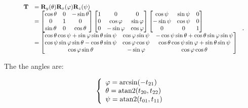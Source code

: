     \begin{equation}
        \scalebox{0.85}{
            $ \begin{array}{ll}
                \mathbf{T}
                &= \mathbf{R}_{y}(\theta)\mathbf{R}_{x}(\varphi)\mathbf{R}_{z}(\psi) \\
                &=
                \begin{bmatrix}
                    \cos \theta & 0 & -\sin \theta \\
                    0 & 1 & 0 \\
                    \sin \theta & 0 & \cos \theta
                \end{bmatrix}
                \begin{bmatrix}
                    1 & 0 & 0 \\
                    0 & \cos \varphi & \sin \varphi \\
                    0 & -\sin \varphi & \cos \varphi
                \end{bmatrix}
                \begin{bmatrix}
                    \cos \psi & \sin \psi & 0 \\
                    -\sin \psi & \cos \psi & 0 \\
                    0 & 0 & 1
                \end{bmatrix} \\
                &=
                \begin{bmatrix}
                    \cos \theta \cos \psi + \sin \varphi \sin \theta \sin \psi
                    &  \cos \varphi \sin \psi
                    & -\cos \psi \sin \theta + \cos \theta \sin \varphi \sin \psi \\
                    \cos \psi \sin \varphi \sin \theta - \cos \theta \sin \psi
                    & \cos \varphi \cos \psi
                    & \cos \theta \cos \psi \sin \varphi + \sin \theta \sin \psi \\
                    \cos \varphi \sin \theta
                    & -\sin \varphi
                    & \cos \varphi \cos \theta
                \end{bmatrix}
            \end{array} $
        }
    .\end{equation}

    The the angles are:

    \begin{equation}
        \left\{ \begin{array}{l}
            \varphi = \arcsin(-t_{21}) \\
            \theta = \operatorname{atan2}(t_{20}, t_{22}) \\
            \psi = \operatorname{atan2}(t_{01}, t_{11})
        \end{array} \right.
    \end{equation}

